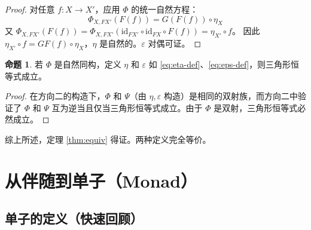 \documentclass[12pt,a4paper]{ctexart}
\theoremstyle{definition}
\newtheorem{proposition}[definition]{命题}
\newcommand{\id}{\mathrm{id}}
\begin{document}
\begin{proof}
对任意 $f: X \to X'$，应用 $\Phi$ 的统一自然方程：
\[
\Phi_{X, FX'}(F(f)) = G(F(f)) \circ \eta_X
\]
又 $\Phi_{X, FX'}(F(f)) = \Phi_{X, FX'}(\id_{FX'} \circ \id_{FX} \circ F(f)) = \eta_{X'} \circ f$。
因此 $\eta_{X'} \circ f = GF(f) \circ \eta_X$，$\eta$ 是自然的。$\varepsilon$ 对偶可证。
\end{proof}

\begin{proposition}\label{prop:triangle-from-Phi}
若 $\Phi$ 是自然同构，定义 $\eta$ 和 $\varepsilon$ 如 \eqref{eq:eta-def}、\eqref{eq:eps-def}，则三角形恒等式成立。
\end{proposition}

\begin{proof}
在方向二的构造下，$\Phi$ 和 $\Psi$（由 $\eta, \varepsilon$ 构造）是相同的双射族，而方向二中验证了 $\Phi$ 和 $\Psi$ 互为逆当且仅当三角形恒等式成立。由于 $\Phi$ 是双射，三角形恒等式必然成立。
\end{proof}

综上所述，定理 \ref{thm:equiv} 得证。两种定义完全等价。

\newpage

\section{从伴随到单子（Monad）}

\subsection{单子的定义（快速回顾）}
\end{document}
